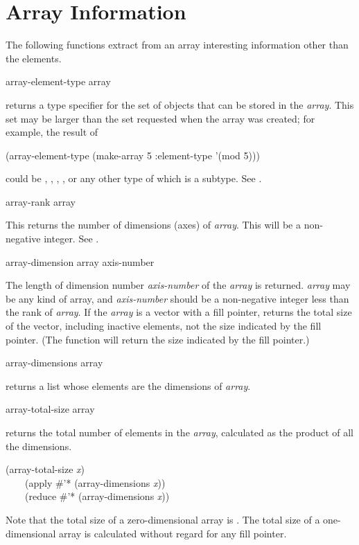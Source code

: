 \section{Array Information}

The following functions extract from an array
interesting information other than the elements.

\begin{defun}[Function]
array-element-type array

 returns a type specifier for the set of objects
that can be stored in the \emph{array}.  This set may be larger than the
set requested when the array was created; for example,
the result of
\begin{lisp}
(array-element-type (make-array 5 :element-type '(mod 5)))
\end{lisp}
could be , , , , or any other
type of which  is a subtype.  See .
\end{defun}

\begin{defun}[Function]
array-rank array

This returns the number of dimensions (axes) of \emph{array}.
This will be a non-negative integer.
See .
\end{defun}

\begin{defun}[Function]
array-dimension array axis-number

The length of dimension number \emph{axis-number} of the \emph{array} is returned.
\emph{array} may be any kind of array, and \emph{axis-number} should
be a non-negative integer less than the rank of \emph{array}.
If the \emph{array} is a vector with a fill pointer,
 returns the total size of the vector,
including inactive elements,
not the size indicated by the fill pointer.
(The function  will return the size indicated
by the fill pointer.)
\end{defun}

\begin{defun}[Function]
array-dimensions array

 returns a list whose elements are the dimensions
of \emph{array}.
\end{defun}

\begin{defun}[Function]
array-total-size array

 returns the total number of elements in the \emph{array},
calculated as the product of all the dimensions.
\begin{lisp}
(array-total-size \emph{x}) \\
~~~\EQ\ (apply \#'* (array-dimensions \emph{x})) \\
~~~\EQ\ (reduce \#'* (array-dimensions \emph{x}))
\end{lisp}
Note that the total size of a zero-dimensional array is .
The total size of a one-dimensional array is calculated without regard
for any fill pointer.
\end{defun}

